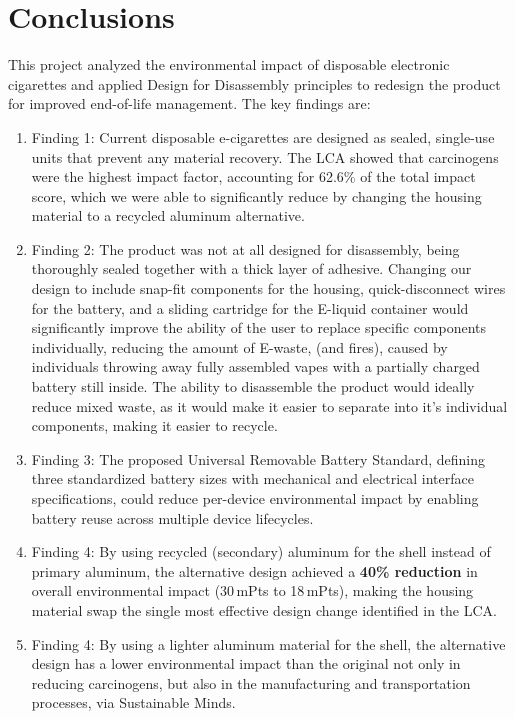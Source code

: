 \section{Conclusions}
\label{sec:conclusions}


This project analyzed the environmental impact of disposable electronic cigarettes and applied Design for Disassembly principles to redesign the product for improved end-of-life management. The key findings are:

\begin{enumerate}
    \item Finding 1: Current disposable e-cigarettes are designed as sealed, single-use units that prevent any material recovery. The LCA showed that carcinogens were the highest impact factor, accounting for 62.6\% of the total impact score, which we were able to significantly reduce by changing the housing material to a recycled aluminum alternative.

    \item Finding 2: The product was not at all designed for disassembly, being thoroughly sealed together with a thick layer of adhesive. Changing our design to include snap-fit components for the housing, quick-disconnect wires for the battery, and a sliding cartridge for the E-liquid container would significantly improve the ability of the user to replace specific components individually, reducing the amount of E-waste, (and fires), caused by individuals throwing away fully assembled vapes with a partially charged battery still inside. The ability to disassemble the product would ideally reduce mixed waste, as it would make it easier to separate into it's individual components, making it easier to recycle.

    \item Finding 3: The proposed Universal Removable Battery Standard, defining three standardized battery sizes with mechanical and electrical interface specifications, could reduce per-device environmental impact by enabling battery reuse across multiple device lifecycles.

    \item Finding 4: By using recycled (secondary) aluminum for the shell instead of primary aluminum, the alternative design achieved a \textbf{40\% reduction} in overall environmental impact (30\,mPts to 18\,mPts), making the housing material swap the single most effective design change identified in the LCA.

    \item Finding 4: By using a lighter aluminum material for the shell, the alternative design has a lower environmental impact than the original not only in reducing carcinogens, but also in the manufacturing and transportation processes, via Sustainable Minds.
    
\end{enumerate}

